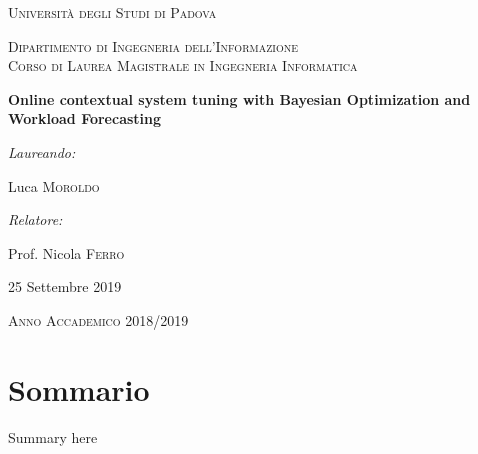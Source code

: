 \documentclass[a4paper]{article} %
\begin{document}
	
	\begin{titlepage}
		\centering
		\vspace*{1cm}
		{\par \scshape\LARGE Università degli Studi di Padova \par}
		\vspace{1cm}
		{\scshape\Large Dipartimento di Ingegneria dell'Informazione\\Corso di Laurea Magistrale in Ingegneria Informatica\par}
		\vspace{1.5cm}
		{\huge\bfseries Online contextual system tuning with Bayesian Optimization and Workload Forecasting\par}
		\vspace{2cm}
		{ \large \itshape Laureando:}
		{ \large Luca \textsc{Moroldo} \par}
		\vspace{0.7cm}
		{ \large \itshape Relatore:}
		{ \large Prof. Nicola \textsc{Ferro} \par}
		\vfill
		
		{ \large 25 Settembre 2019 \par}
		{ \large \textsc{Anno Accademico 2018/2019}\par}
	\end{titlepage}
	
	\clearpage%
	\thispagestyle{empty}%
	\addtocounter{page}{-1}%
	\null%
	\clearpage
	
	\newpage
	\thispagestyle{plain}
	\section*{Sommario}
	
	Summary here
	
	
	\clearpage%
	\thispagestyle{empty}%
	\addtocounter{page}{-1}%
	\null%
	\clearpage
	
	\renewcommand{\contentsname}{Indice}
	\newpage
	\thispagestyle{plain}
	\tableofcontents

	\clearpage%
	\thispagestyle{empty}%
	\addtocounter{page}{-1}%
	\null%
	\clearpage
	
	
	
	\newpage
	
\end{document}
